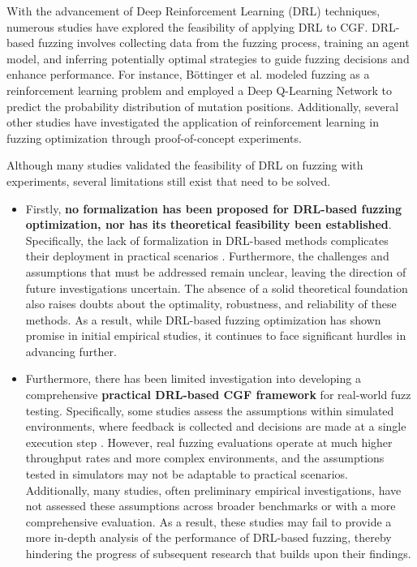\documentclass[lettersize,journal]{IEEEtran}
\begin{document}
With the advancement of Deep Reinforcement Learning (DRL) techniques, numerous studies have explored the feasibility of applying DRL to CGF. DRL-based fuzzing involves collecting data from the fuzzing process, training an agent model, and inferring potentially optimal strategies to guide fuzzing decisions and enhance performance. For instance, Böttinger et al. \cite{bottingerDeepReinforcementFuzzing2018} modeled fuzzing as a reinforcement learning problem and employed a Deep Q-Learning Network to predict the probability distribution of mutation positions. Additionally, several other studies \cite{gongDRLFCfuzzerFuzzingDeepReinforcementLearning2022, jeonDrPathFinderHybrid2022, liangRLFDirectedFuzzing2022, liuXRLFuzzFuzzingBinaries2024,binosiRainfuzzReinforcementlearningDriven2023} have investigated the application of reinforcement learning in fuzzing optimization through proof-of-concept experiments.

Although many studies validated the feasibility of DRL on fuzzing with experiments, several limitations still exist that need to be solved. 
\begin{itemize}
	\item Firstly, \textbf{no formalization has been proposed for DRL-based fuzzing optimization, nor has its theoretical feasibility been established}. Specifically, the lack of formalization in DRL-based methods complicates their deployment in practical scenarios \cite{liFirstLookEffect2021, liDeepLearningCoverageguided2022}. Furthermore, the challenges and assumptions that must be addressed remain unclear, leaving the direction of future investigations uncertain. The absence of a solid theoretical foundation also raises doubts about the optimality, robustness, and reliability of these methods. As a result, while DRL-based fuzzing optimization has shown promise in initial empirical studies, it continues to face significant hurdles in advancing further.
	
	\item Furthermore, there has been limited investigation into developing a comprehensive \textbf{practical DRL-based CGF framework} for real-world fuzz testing. Specifically, some studies assess the assumptions within simulated environments, where feedback is collected and decisions are made at a single execution step \cite{drozdFuzzerGymCompetitiveFramework2018,paduraruRiverFuzzRLOpensourceTool2021}. However, real fuzzing evaluations operate at much higher throughput rates and more complex environments, and the assumptions tested in simulators may not be adaptable to practical scenarios. Additionally, many studies, often preliminary empirical investigations, have not assessed these assumptions across broader benchmarks or with a more comprehensive evaluation. As a result, these studies may fail to provide a more in-depth analysis of the performance of DRL-based fuzzing, thereby hindering the progress of subsequent research that builds upon their findings.
\end{itemize}
\end{document}
